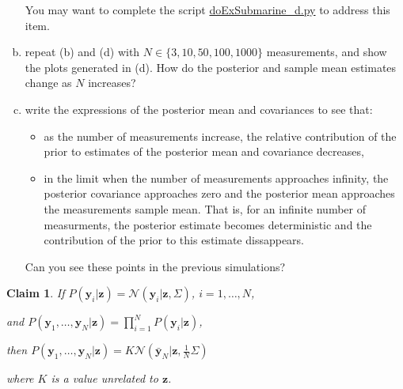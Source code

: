 \documentclass[12pt]{article}
\newtheorem{claim}{Claim}
\begin{document}
\begin{enumerate}[(a)]
        You may want to complete the script
        \href{http://github.com/joacorapela/gcnu\_bridging2023}{doExSubmarine\_d.py}
        to address this item.

    \item repeat (b) and (d) with $N\in\{3,10,50,100,1000\}$ measurements, and show
        the plots generated in (d).  How do the posterior and sample mean
        estimates change as $N$ increases?

    \item write the expressions of the posterior mean and covariances to
        see that:

        \begin{itemize}

            \item as the number of measurements increase, the relative
                contribution of the prior to estimates of the posterior
                mean and covariance decreases,

            \item in the limit when the number of measurements approaches
                infinity, the posterior covariance approaches zero and the
                posterior mean approaches the measurements sample mean.
                That is, for an infinite number of measurments, the
                posterior estimate becomes deterministic and the
                contribution of the prior to this estimate dissappears.

        \end{itemize}

        Can you see these points in the previous simulations?

\end{enumerate}

\pagebreak

\begin{claim}
    If
    $P(\mathbf{y}_i|\mathbf{z})=\mathcal{N}\left(\mathbf{y}_i|\mathbf{z},\Sigma\right)$,
    $i=1,\ldots,N$, 

    and
    $P(\mathbf{y}_1,\ldots,\mathbf{y}_N|\mathbf{z})=\prod_{i=1}^N
    P(\mathbf{y}_i|\mathbf{z})$, 

    then
    $P(\mathbf{y}_1,\ldots,\mathbf{y}_N|\mathbf{z})=K\mathcal{N}(\bar{\mathbf{y}}_N|\mathbf{z},\frac{1}{N}\Sigma)$
    \label{claim:likelihoodForZ}

    where $K$ is a value unrelated to $\mathbf{z}$.
\end{claim}
\end{document}
